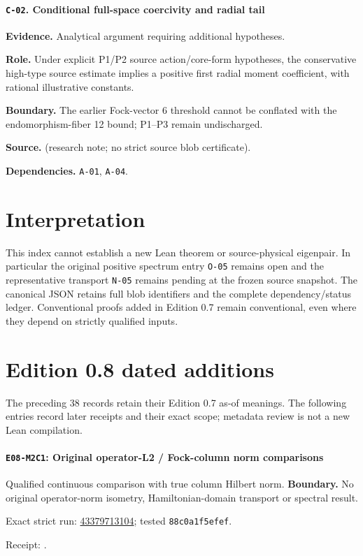 \paragraph{\texttt{C-02}. Conditional full-space coercivity and radial tail}
\noindent\textbf{Evidence.} Analytical argument requiring additional hypotheses.
\par\noindent\textbf{Role.} Under explicit P1/P2 source action/core-form hypotheses, the conservative high-type source estimate implies a positive first radial moment coefficient, with rational illustrative constants.
\par\noindent\textbf{Boundary.} The earlier Fock-vector 6 threshold cannot be conflated with the endomorphism-fiber 12 bound; P1--P3 remain undischarged.
\par\noindent\textbf{Source.}  (research note; no strict source blob certificate).
\par\noindent\textbf{Dependencies.} \texttt{A-01}, \texttt{A-04}.
\medskip

\endgroup
\section{Interpretation}
This index cannot establish a new Lean theorem or source-physical
eigenpair. In particular the original positive spectrum entry
\texttt{O-05} remains open and the representative transport
\texttt{N-05} remains pending at the frozen source snapshot.
The canonical JSON retains full blob identifiers and the complete
dependency/status ledger. Conventional proofs added in Edition 0.7
remain conventional, even where they depend on strictly qualified inputs.

\section{Edition 0.8 dated additions}
The preceding 38 records retain their Edition 0.7 as-of meanings.
The following entries record later receipts and their exact scope;
metadata review is not a new Lean compilation.
\paragraph{\texttt{E08-M2C1}: Original operator-L2 / Fock-column norm comparisons}
Qualified continuous comparison with true column Hilbert norm.
\textbf{Boundary.} No original operator-norm isometry, Hamiltonian-domain transport or spectral result.
\par\noindent Exact strict run: \href{https://github.com/etblink/math/actions/runs/43379713104}{43379713104}; tested \texttt{88c0a1f5efef}.\par
\begingroup\small\sloppy\noindent Receipt: .\par\endgroup
